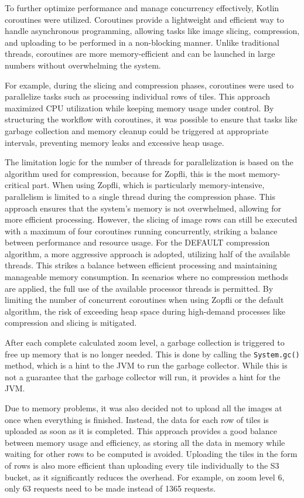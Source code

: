 To further optimize performance and manage concurrency effectively, Kotlin coroutines were utilized. Coroutines provide a lightweight and efficient way to handle asynchronous programming, allowing tasks like image slicing, compression, and uploading to be performed in a non-blocking manner. Unlike traditional threads, coroutines are more memory-efficient and can be launched in large numbers without overwhelming the system.

For example, during the slicing and compression phases, coroutines were used to parallelize tasks such as processing individual rows of tiles. This approach maximized CPU utilization while keeping memory usage under control. By structuring the workflow with coroutines, it was possible to ensure that tasks like garbage collection and memory cleanup could be triggered at appropriate intervals, preventing memory leaks and excessive heap usage.

The limitation logic for the number of threads for parallelization is based on the algorithm used for compression, because for Zopfli, this is the most memory-critical part. When using Zopfli, which is particularly memory-intensive, parallelism is limited to a single thread during the compression phase. This approach ensures that the system's memory is not overwhelmed, allowing for more efficient processing. However, the slicing of image rows can still be executed with a maximum of four coroutines running concurrently, striking a balance between performance and resource usage. For the DEFAULT compression algorithm, a more aggressive approach is adopted, utilizing half of the available threads. This strikes a balance between efficient processing and maintaining manageable memory consumption. In scenarios where no compression methods are applied, the full use of the available processor threads is permitted. By limiting the number of concurrent coroutines when using Zopfli or the default algorithm, the risk of exceeding heap space during high-demand processes like compression and slicing is mitigated.

After each complete calculated zoom level, a garbage collection is triggered to free up memory that is no longer needed. This is done by calling the \texttt{System.gc()} method, which is a hint to the JVM to run the garbage collector. While this is not a guarantee that the garbage collector will run, it provides a hint for the JVM.

Due to memory problems, it was also decided not to upload all the images at once when everything is finished. Instead, the data for each row of tiles is uploaded as soon as it is completed. This approach provides a good balance between memory usage and efficiency, as storing all the data in memory while waiting for other rows to be computed is avoided. Uploading the tiles in the form of rows is also more efficient than uploading every tile individually to the S3 bucket, as it significantly reduces the overhead. For example, on zoom level 6, only 63 requests need to be made instead of 1365 requests.